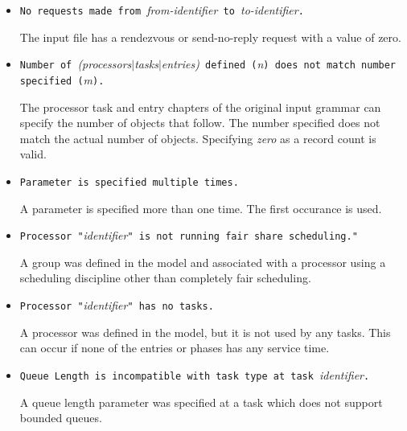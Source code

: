 \begin{itemize}
\item \texttt{No requests made from }\emph{from-identifier}\texttt{ to
  }\emph{to-identifier}\texttt{.}
  
  The input file has a rendezvous or
  send-no-reply request with a value of
  zero.

\item \texttt{Number of }\emph{(processors$|$tasks$|$entries)}\texttt{
    defined (}\emph{n}\texttt{) does not match number specified
    (}\emph{m}\texttt{).}

  The processor task and entry chapters of the original input
  grammar can specify the number of objects
  that follow.  The number specified does not match the actual number
  of objects.  Specifying \emph{zero} as a record count is valid.

\item \texttt{Parameter is specified multiple times.}

  A parameter is specified more than one time.  The first occurance is
  used.

\item \texttt{Processor "}\emph{identifier}\texttt{" is not running fair share scheduling." }
  
  A group was defined in the model and associated
  with a processor using a scheduling discipline other than completely fair scheduling.

\item \texttt{Processor "}\emph{identifier}\texttt{" has no tasks.}
  
  A processor was defined in the model, but it is not used by any
  tasks.  This can occur if none of the
  entries or phases has any service time.

\item \texttt{Queue Length is incompatible with task type at task
  }\emph{identifier}\texttt{.}
  
  A queue length parameter was specified at a
  task which does not support bounded queues.


\end{itemize}
